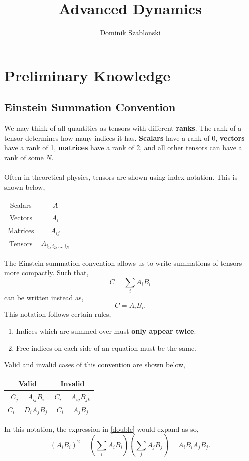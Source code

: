 \documentclass{book}
\title{Advanced Dynamics}
\author{Dominik Szablonski}
\begin{document}
\maketitle

\tableofcontents

\chapter{Preliminary Knowledge}
\section{Einstein Summation Convention}
We may think of all quantities as tensors with different \textbf{ranks}. The rank of a tensor determines how many indices it has. \textbf{Scalars} have a rank of 0, \textbf{vectors} have a rank of 1, \textbf{matrices} have a rank of 2, and all other tensors can have a rank of some $N$.
\\\\
Often in theoretical physics, tensors are shown using index notation. This is shown below,  
\begin{center}
\begin{tabular}{c c}
     Scalars & $A$ \\
     Vectors &  $A_i$ \\
     Matrices & $A_{ij}$ \\
     Tensors & $A_{i_1,i_2,\ldots ,i_N}$
\end{tabular}
\end{center}
The Einstein summation convention allows us to write summations of tensors more compactly. Such that,
\begin{equation}
     C = \sum_i A_iB_i 
\end{equation}
can be written instead as,
\begin{equation}
    C = A_iB_i.
\end{equation}
This notation follows certain rules,
\begin{enumerate}
    \item Indices which are summed over must \textbf{only appear twice}.
    \item Free indices on each side of an equation must be the same.
\end{enumerate}
Valid and invalid cases of this convention are shown below,
\begin{center}
\begin{tabular}{c c}
     Valid & Invalid \\
     \hline
     $C_j = A_{ij}B_i$ & $C_i = A_{ij}B_{jk}$ \\
     $C_i = D_iA_{j}B_{j}$ & $C_i = A_jB_j$
\end{tabular}
\end{center}
In this notation, the expression in \eqref{double} would expand as so,
\begin{equation}\label{double}
    (A_iB_i)^2 = \left(\sum_iA_iB_i\right)\left(\sum_jA_jB_j\right) = A_iB_iA_jB_j.
\end{equation}
\end{document}
